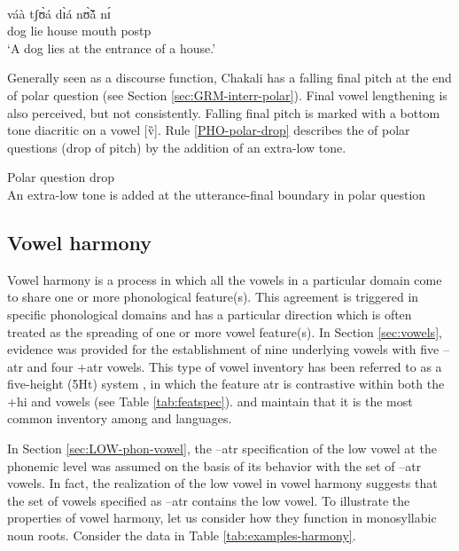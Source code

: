 \newpage 

 
\begin{exe}
\ex\label{ex:PHO-downdrift}

\glll {\Tten \Teight} {\Tseven \Tnine} {\Tfive \Tsix} {\Ttwo \Tfour} {\Tthree}\\
váà tʃʊ̀á dɪ̀á nʊ̃̀ã́ nɪ́ \\
dog lie house mouth {\sc postp} \\
\glt  `A dog lies at the entrance of a house.'
\end{exe}




Generally seen as a discourse function, Chakali has a falling final pitch at the end of polar question (see Section \ref{sec:GRM-interr-polar}). Final vowel lengthening is also perceived, but not consistently.  Falling final pitch is marked with a bottom tone diacritic on a vowel [v̏]. Rule \ref{PHO-polar-drop} describes the   of  polar questions (drop of pitch) by the addition of an extra-low tone.

\begin{Rule}\label{PHO-polar-drop}{Polar question drop}\\
An extra-low tone is added at the utterance-final boundary in polar question\\

\end{Rule}


\subsection{Vowel harmony}
\label{sec:vowel-harmony}

Vowel harmony is a process in  which all the vowels in a particular domain come to share one or more phonological feature(s).   This agreement  is triggered in specific phonological domains and  has a particular direction which is often treated as the spreading of one or more vowel feature(s).  In Section \ref{sec:vowels},  evidence was provided for the establishment of nine underlying vowels with five {\sc --atr} and four  {\sc +atr} vowels. This type of  vowel inventory has been referred to as  a five-height (5Ht) system \citep[308]{Casa03},  in which the feature {\sc atr} is contrastive within both the {\sc +hi} and {\sc [--hi, --lo]} vowels (see Table \ref{tab:featspec}).  \citet[81--82]{Daku97} and \citet[312]{Casa03} maintain that it is the most common inventory among  and  languages. 

In Section \ref{sec:LOW-phon-vowel},  the
{\sc --atr} specification of the low vowel at the phonemic level was assumed
  on the basis of its behavior with the set of {\sc --atr} vowels. In
fact, the  realization of the low vowel in vowel harmony suggests that the set
of vowels specified as {\sc --atr}  contains the low vowel. To illustrate
the properties of vowel harmony, let us consider
how they function in  monosyllabic noun roots. Consider the data in
Table
\ref{tab:examples-harmony}.



